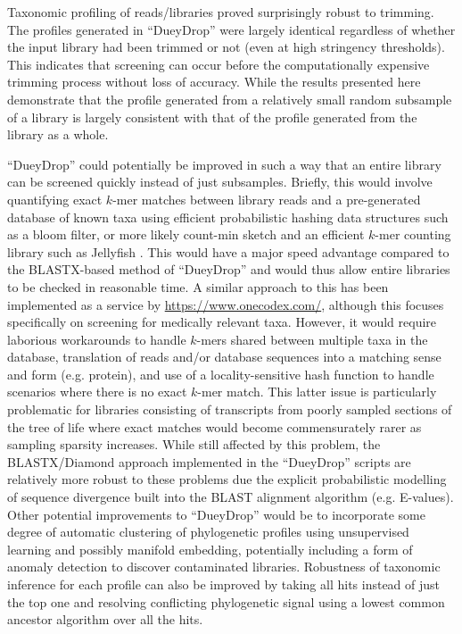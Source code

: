Taxonomic profiling of reads/libraries proved surprisingly robust to trimming.  The profiles
generated in ``DueyDrop'' were largely identical regardless of whether the input library 
had been trimmed or not (even at high stringency thresholds).  This indicates that
screening can occur before the computationally expensive trimming process without loss
of accuracy.   
While the results presented here demonstrate that the profile
generated from a relatively small random subsample of a library is largely consistent 
with that of the profile generated from the library as a whole.
 
``DueyDrop'' could potentially be improved in such a way that an entire library can be screened quickly instead of just subsamples.
Briefly, this would involve quantifying exact \(k\)-mer matches between library reads and a pre-generated database of known taxa
using efficient probabilistic hashing data structures such as a bloom filter, or more likely count-min sketch and an efficient
\(k\)-mer counting library such as Jellyfish \citep{Marcais2011}.  This would have a major speed advantage compared to the BLASTX-based method of ``DueyDrop''
and would thus allow entire libraries to be checked in reasonable time.  A similar approach to this has been implemented as a service
by \url{https://www.onecodex.com/}, although this focuses specifically on screening for medically relevant taxa. 
However, it would require laborious workarounds to handle
\(k\)-mers shared between multiple taxa in the database, translation of reads and/or database sequences into a matching sense and form (e.g. protein),
and use of a locality-sensitive hash function to handle scenarios where there is no exact \(k\)-mer match. This latter issue is particularly
problematic for libraries consisting of transcripts from poorly sampled sections of the tree of life where exact matches would become
commensurately rarer as sampling sparsity increases.  
While still affected by this problem, the BLASTX/Diamond approach implemented in the ``DueyDrop'' scripts are relatively more robust to these
problems due the explicit probabilistic modelling of sequence divergence built into the BLAST alignment algorithm (e.g. E-values).
Other potential improvements to ``DueyDrop'' would be to incorporate some degree of 
automatic clustering of phylogenetic profiles using unsupervised learning and possibly manifold embedding, potentially
including a form of anomaly detection to discover contaminated libraries.  
Robustness of taxonomic inference for each profile can also be improved by taking all hits instead of just the top one
and resolving conflicting phylogenetic signal using a lowest common ancestor algorithm over all the hits.

